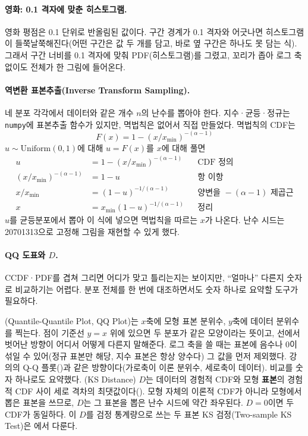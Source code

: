 \paragraph{영화: 0.1 격자에 맞춘 히스토그램.}
영화 평점은 0.1 단위로 반올림된 값이다. 구간 경계가 0.1 격자와 어긋나면 히스토그램이
들쭉날쭉해진다(어떤 구간은 값 두 개를 담고, 바로 옆 구간은 하나도 못 담는 식). 그래서
구간 너비를 0.1 격자에 맞춰 PDF(히스토그램)를 그렸고, 꼬리가 좁아 로그 축 없이도
전체가 한 그림에 들어온다.

\paragraph{역변환 표본추출(Inverse Transform Sampling).}
네 분포 각각에서 데이터와 같은 개수 $n$의 난수를 뽑아야 한다. 지수·균등·정규는
\texttt{numpy}에 표본추출 함수가 있지만, 멱법칙은 없어서 직접 만들었다. 멱법칙의
CDF는
\[
  F(x) = 1 - (x/x_{\min})^{-(\alpha-1)}
\]
$u \sim \mathrm{Uniform}(0,1)$에 대해 $u = F(x)$를 $x$에 대해 풀면
\begin{align*}
  u &= 1 - (x/x_{\min})^{-(\alpha-1)}          && \text{CDF 정의}\\
  (x/x_{\min})^{-(\alpha-1)} &= 1-u            && \text{항 이항}\\
  x/x_{\min} &= (1-u)^{-1/(\alpha-1)}          && \text{양변을 } -(\alpha-1)\text{ 제곱근}\\
  x &= x_{\min}(1-u)^{-1/(\alpha-1)}           && \text{정리}
\end{align*}
$u$를 균등분포에서 뽑아 이 식에 넣으면 멱법칙을 따르는 $x$가 나온다. 난수 시드는
20701313으로 고정해 그림을 재현할 수 있게 했다.

\paragraph{QQ 도표와 $D$.}
CCDF·PDF를 겹쳐 그리면 어디가 맞고 틀리는지는 보이지만, ``얼마나'' 다른지 숫자로
비교하기는 어렵다. 분포 전체를 한 번에 대조하면서도 숫자 하나로 요약할 도구가
필요하다.

(Quantile-Quantile Plot, QQ Plot)는 $x$축에 모형 표본
분위수, $y$축에 데이터 분위수를 찍는다. 점이 기준선 $y=x$ 위에 있으면 두 분포가
같은 모양이라는 뜻이고, 선에서 벗어난 방향이 어디서 어떻게 다른지 말해준다. 로그
축을 쓸 때는 표본에 음수나 0이 섞일 수 있어(정규 표본만 해당, 지수 표본은 항상
양수다) 그 값을 먼저 제외했다.
강의의 Q-Q 플롯()과 같은 방향이다(가로축이 이론 분위수, 세로축이 데이터).
비교를 숫자 하나로도 요약했다. (KS Distance)
$D$는 데이터의 경험적 CDF와 모형 \textbf{표본}의 경험적 CDF 사이 세로 격차의
최댓값이다(). 모형 자체의 이론적 CDF가 아니라 모형에서 뽑은 표본을
쓰므로, $D$는 그 표본을 뽑은 난수 시드에 약간 좌우된다. $D=0$이면 두 CDF가 동일하다.
이 $D$를 검정 통계량으로 쓰는 두 표본 KS 검정(Two-sample KS Test)은 에서 다룬다.

